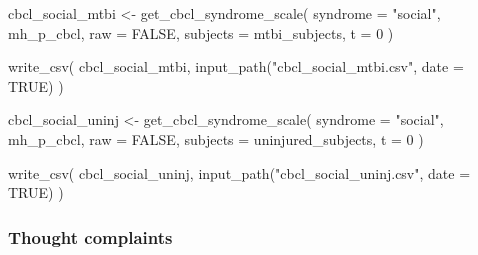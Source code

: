\documentclass[
  letterpaper,
  DIV=11,
  numbers=noendperiod]{scrreprt}
\newenvironment{Shaded}{\begin{snugshade}}{\end{snugshade}}
\newcommand{\AttributeTok}[1]{\textcolor[rgb]{0.40,0.45,0.13}{#1}}
\newcommand{\ConstantTok}[1]{\textcolor[rgb]{0.56,0.35,0.01}{#1}}
\newcommand{\DecValTok}[1]{\textcolor[rgb]{0.68,0.00,0.00}{#1}}
\newcommand{\FunctionTok}[1]{\textcolor[rgb]{0.28,0.35,0.67}{#1}}
\newcommand{\NormalTok}[1]{\textcolor[rgb]{0.00,0.23,0.31}{#1}}
\newcommand{\OtherTok}[1]{\textcolor[rgb]{0.00,0.23,0.31}{#1}}
\newcommand{\StringTok}[1]{\textcolor[rgb]{0.13,0.47,0.30}{#1}}
\begin{document}
\begin{Shaded}
\begin{Highlighting}[]
\NormalTok{cbcl\_social\_mtbi }\OtherTok{\textless{}{-}} \FunctionTok{get\_cbcl\_syndrome\_scale}\NormalTok{(}
    \AttributeTok{syndrome =} \StringTok{"social"}\NormalTok{,}
\NormalTok{    mh\_p\_cbcl,}
    \AttributeTok{raw =} \ConstantTok{FALSE}\NormalTok{,}
    \AttributeTok{subjects =}\NormalTok{ mtbi\_subjects,}
    \AttributeTok{t =} \DecValTok{0}
\NormalTok{)}

\FunctionTok{write\_csv}\NormalTok{(}
\NormalTok{    cbcl\_social\_mtbi,}
    \FunctionTok{input\_path}\NormalTok{(}\StringTok{"cbcl\_social\_mtbi.csv"}\NormalTok{, }\AttributeTok{date =} \ConstantTok{TRUE}\NormalTok{)}
\NormalTok{)}

\NormalTok{cbcl\_social\_uninj }\OtherTok{\textless{}{-}} \FunctionTok{get\_cbcl\_syndrome\_scale}\NormalTok{(}
    \AttributeTok{syndrome =} \StringTok{"social"}\NormalTok{,}
\NormalTok{    mh\_p\_cbcl,}
    \AttributeTok{raw =} \ConstantTok{FALSE}\NormalTok{,}
    \AttributeTok{subjects =}\NormalTok{ uninjured\_subjects,}
    \AttributeTok{t =} \DecValTok{0}
\NormalTok{)}

\FunctionTok{write\_csv}\NormalTok{(}
\NormalTok{    cbcl\_social\_uninj,}
    \FunctionTok{input\_path}\NormalTok{(}\StringTok{"cbcl\_social\_uninj.csv"}\NormalTok{, }\AttributeTok{date =} \ConstantTok{TRUE}\NormalTok{)}
\NormalTok{)}
\end{Highlighting}
\end{Shaded}

\subsubsection{Thought complaints}\label{thought-complaints}
\end{document}
